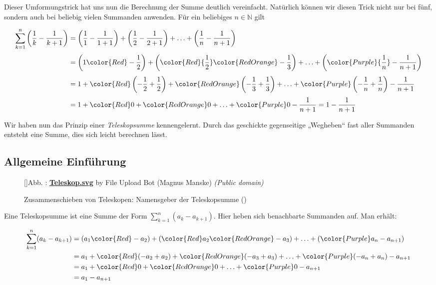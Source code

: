 \documentclass[fontsize=9pt,
               parskip=half-,
               DIV=14,
               listof=chapterentry,
               tocflat]{scrbook}
\newcounter{imagelabel}
\begin{document}
Dieser Umformungstrick hat uns nun die Berechnung der Summe deutlich vereinfacht. Natürlich können wir diesen Trick nicht nur bei fünf, sondern auch bei beliebig vielen Summanden anwenden. Für ein beliebiges $n\in \mathbb {N} $ gilt

\begin{align*}
\sum _{k=1}^{n}\left({\frac {1}{k}}-{\frac {1}{k+1}}\right)&=\left({\frac {1}{1}}-{\frac {1}{1+1}}\right)+\left({\frac {1}{2}}-{\frac {1}{2+1}}\right)+\ldots +\left({\frac {1}{n}}-{\frac {1}{n+1}}\right)\\[0.3em]&=\left(1{\color {Red}-{\frac {1}{2}}}\right)+\left({\color {Red}{\frac {1}{2}}}{\color {RedOrange}-{\frac {1}{3}}}\right)+\ldots +\left({\color {Purple}{\frac {1}{n}}}-{\frac {1}{n+1}}\right)\\[0.3em]&=1+{\color {Red}\left(-{\frac {1}{2}}+{\frac {1}{2}}\right)}+{\color {RedOrange}\left(-{\frac {1}{3}}+{\frac {1}{3}}\right)}+\ldots +{\color {Purple}\left(-{\frac {1}{n}}+{\frac {1}{n}}\right)}-{\frac {1}{n+1}}\\[0.3em]&=1+{\color {Red}0}+{\color {RedOrange}0}+\ldots +{\color {Purple}0}-{\frac {1}{n+1}}=1-{\frac {1}{n+1}}
\end{align*}

Wir haben nun das Prinzip einer \emph{Teleskopsumme} kennengelernt. Durch das geschickte gegenseitige „Wegheben“ fast aller Summanden entsteht eine Summe, dies sich leicht berechnen lässt.

\subsection{Allgemeine Einführung}

\begin{figure}[h]
\vspace{\baselineskip}
[]{Abb. : \protect\href{https://commons.wikimedia.org/wiki/File:Teleskop.svg}{\textbf{Teleskop.svg}} by File Upload Bot (Magnus Manske) \textit{(Public domain)}}\centering
{}
\caption*{Zusammenschieben von Teleskopen: Namensgeber der Teleskopsumme ()}
\end{figure}
Eine Teleskopsumme ist eine Summe der Form $\sum _{k=1}^{n}(a_{k}-a_{k+1})$. Hier heben sich benachbarte Summanden auf. Man erhält:

\begin{align*}
\sum _{k=1}^{n}(a_{k}-a_{k+1})&=(a_{1}{\color {Red}-a_{2}})+({\color {Red}a_{2}}{\color {RedOrange}-a_{3}})+\ldots +({\color {Purple}a_{n}}-a_{n+1})\\&=a_{1}+{\color {Red}(-a_{2}+a_{2})}+{\color {RedOrange}(-a_{3}+a_{3})}+\ldots +{\color {Purple}(-a_{n}+a_{n})}-a_{n+1}\\&=a_{1}+{\color {Red}0}+{\color {RedOrange}0}+\ldots +{\color {Purple}0}-a_{n+1}\\&=a_{1}-a_{n+1}
\end{align*}
\end{document}
